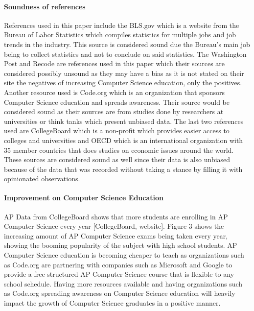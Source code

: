 \documentclass[12pt, letterpaper]{report}
\begin{document}
\paragraph*{Soundness of references \\}
References used in this paper include the BLS.gov which is a website from the Bureau of Labor Statistics which compiles statistics for multiple jobs and job trends in the industry. This source is considered sound due the Bureau's main job being to collect statistics and not to conclude on said statistics. The Washington Post and Recode are references used in this paper which their sources are considered possibly unsound as they may have a bias as it is not stated on their site the negatives of increasing Computer Science education, only the positives. Another resource used is Code.org which is an organization that sponsors Computer Science education and spreads awareness. Their source would be considered sound as their sources are from studies done by researchers at universities or think tanks which present unbiased data. The last two references used are CollegeBoard which is a non-profit which provides easier access to colleges and universities and OECD which is an international organization with 35 member countries that does studies on economic issues around the world. These sources are considered sound as well since their data is also unbiased because of the data that was recorded without taking a stance by filling it with opinionated observations. 

\paragraph*{Improvement on Computer Science Education \\}
AP Data from CollegeBoard shows that more students are enrolling in AP Computer Science every year [CollegeBoard, website]. Figure 3 shows the increasing amount of AP Computer Science exams being taken every year, showing the booming popularity of the subject with high school students. AP Computer Science education is becoming cheaper to teach as organizations such as Code.org are partnering with companies such as Microsoft and Google to provide a free structured AP Computer Science course that is flexible to any school schedule. Having more resources available and having organizations such as Code.org spreading awareness on Computer Science education will heavily impact the growth of Computer Science graduates in a positive manner.
\end{document}

